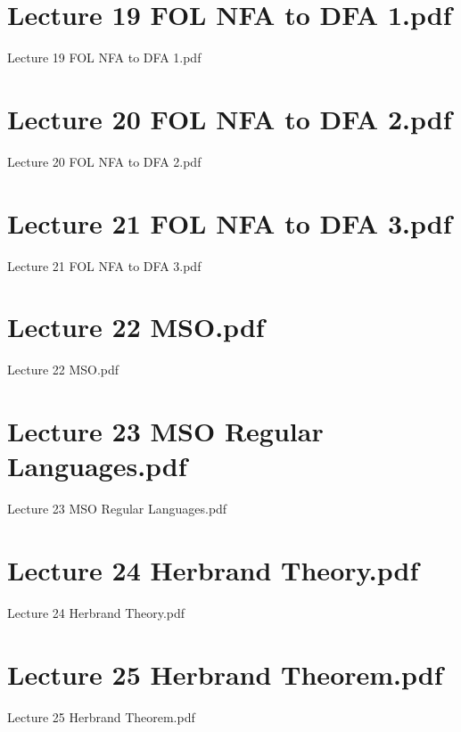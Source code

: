 \documentclass[aspectratio = 43]{beamer}
\begin{document}
\section{Lecture 19 FOL NFA to DFA 1.pdf}
\begin{frame}{Lecture 19 FOL NFA to DFA 1.pdf}
\end{frame}

\section{Lecture 20 FOL NFA to DFA 2.pdf}
\begin{frame}{Lecture 20 FOL NFA to DFA 2.pdf}
\end{frame}

\section{Lecture 21 FOL NFA to DFA 3.pdf}
\begin{frame}{Lecture 21 FOL NFA to DFA 3.pdf}
\end{frame}

\section{Lecture 22 MSO.pdf}
\begin{frame}{Lecture 22 MSO.pdf}
\end{frame}

\section{Lecture 23 MSO Regular Languages.pdf}
\begin{frame}{Lecture 23 MSO Regular Languages.pdf}
\end{frame}

\section{Lecture 24 Herbrand Theory.pdf}
\begin{frame}{Lecture 24 Herbrand Theory.pdf}
\end{frame}

\section{Lecture 25 Herbrand Theorem.pdf}
\begin{frame}{Lecture 25 Herbrand Theorem.pdf}
\end{frame}

\end{document}
